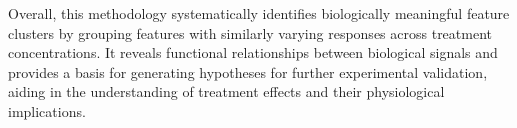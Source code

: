 \documentclass{report}
\begin{document}
        Overall, this methodology systematically identifies biologically meaningful feature clusters by grouping features with similarly varying responses across treatment concentrations. It reveals functional relationships between biological signals and provides a basis for generating hypotheses for further experimental validation, aiding in the understanding of treatment effects and their physiological implications.




       
        
\end{document}
